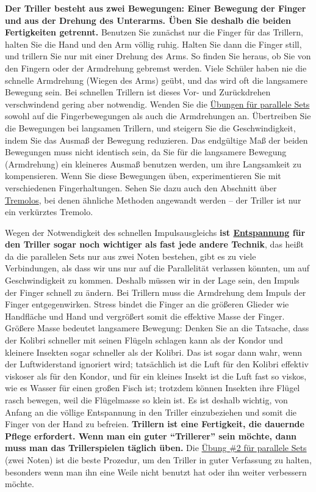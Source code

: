 \textbf{Der Triller besteht aus zwei Bewegungen: Einer Bewegung der Finger und aus der Drehung des Unterarms.
Üben Sie deshalb die beiden Fertigkeiten getrennt.}
Benutzen Sie zunächst nur die Finger für das Trillern, halten Sie die Hand und den Arm völlig ruhig.
Halten Sie dann die Finger still, und trillern Sie nur mit einer Drehung des Arms.
So finden Sie heraus, ob Sie von den Fingern oder der Armdrehung gebremst werden.
Viele Schüler haben nie die schnelle Armdrehung (Wiegen des Arms) geübt, und das wird oft die langsamere Bewegung sein.
Bei schnellen Trillern ist dieses Vor- und Zurückdrehen verschwindend gering aber notwendig.
Wenden Sie die \hyperref[c1iii7b]{Übungen für parallele Sets} sowohl auf die Fingerbewegungen als auch die Armdrehungen an.
Übertreiben Sie die Bewegungen bei langsamen Trillern, und steigern Sie die Geschwindigkeit, indem Sie das Ausmaß der Bewegung reduzieren.
Das endgültige Maß der beiden Bewegungen muss nicht identisch sein, da Sie für die langsamere Bewegung (Armdrehung) ein kleineres Ausmaß benutzen werden, um ihre Langsamkeit zu kompensieren.
Wenn Sie diese Bewegungen üben, experimentieren Sie mit verschiedenen Fingerhaltungen.
Sehen Sie dazu auch den Abschnitt über \hyperref[c1iii3b]{Tremolos}, bei denen ähnliche Methoden angewandt werden -- der Triller ist nur ein verkürztes Tremolo.

Wegen der Notwendigkeit des schnellen Impulsausgleichs \textbf{ist \hyperref[c1ii14]{Entspannung} für den Triller sogar noch wichtiger als fast jede andere Technik}, das heißt da die parallelen Sets nur aus zwei Noten bestehen, gibt es zu viele Verbindungen, als dass wir uns nur auf die Parallelität verlassen könnten, um auf Geschwindigkeit zu kommen.
Deshalb müssen wir in der Lage sein, den Impuls der Finger schnell zu ändern.
Bei Trillern muss die Armdrehung dem Impuls der Finger entgegenwirken.
Stress bindet die Finger an die größeren Glieder wie Handfläche und Hand und vergrößert somit die effektive Masse der Finger.
Größere Masse bedeutet langsamere Bewegung: Denken Sie an die Tatsache, dass der Kolibri schneller mit seinen Flügeln schlagen kann als der Kondor und kleinere Insekten sogar schneller als der Kolibri.
Das ist sogar dann wahr, wenn der Luftwiderstand ignoriert wird; tatsächlich ist die Luft für den Kolibri effektiv viskoser als für den Kondor, und für ein kleines Insekt ist die Luft fast so viskos, wie es Wasser für einen großen Fisch ist; trotzdem können Insekten ihre Flügel rasch bewegen, weil die Flügelmasse so klein ist.
Es ist deshalb wichtig, von Anfang an die völlige Entspannung in den Triller einzubeziehen und somit die Finger von der Hand zu befreien.
\textbf{Trillern ist eine Fertigkeit, die dauernde Pflege erfordert.
Wenn man ein guter \enquote{Trillerer} sein möchte, dann muss man das Trillerspielen täglich üben.}
Die \hyperref[c1iii7b2]{Übung \#2 für parallele Sets} (zwei Noten) ist die beste Prozedur, um den Triller in guter Verfassung zu halten, besonders wenn man ihn eine Weile nicht benutzt hat oder ihn weiter verbessern möchte.

